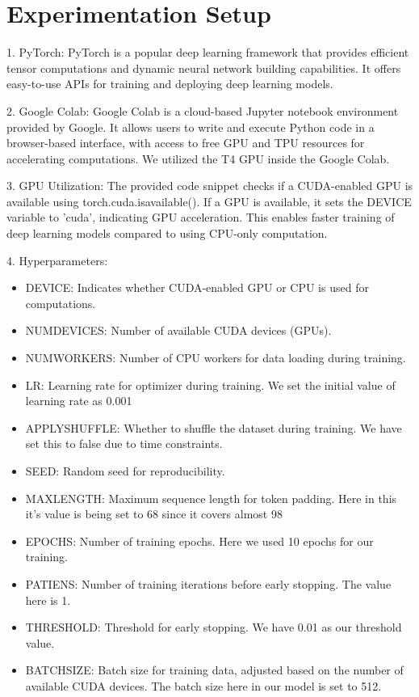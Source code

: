 \documentclass[12pt,a4paper]{report}     %
\begin{document}
\begin{normalsize}
{{\begin{itemize}
\end{itemize}
\section{Experimentation Setup }
1. PyTorch: PyTorch is a popular deep learning framework that provides efficient tensor computations and dynamic neural network building capabilities. It offers easy-to-use APIs for training and deploying deep learning models.

2. Google Colab: Google Colab is a cloud-based Jupyter notebook environment provided by Google. It allows users to write and execute Python code in a browser-based interface, with access to free GPU and TPU resources for accelerating computations. We utilized the T4 GPU inside the Google Colab.

3. GPU Utilization: The provided code snippet checks if a CUDA-enabled GPU is available using torch.cuda.is\textunderscore available(). If a GPU is available, it sets the DEVICE variable to 'cuda', indicating GPU acceleration. This enables faster training of deep learning models compared to using CPU-only computation.

4. Hyperparameters:
\begin{itemize}
\item DEVICE: Indicates whether CUDA-enabled GPU or CPU is used for computations.
\item NUM\textunderscore DEVICES: Number of available CUDA devices (GPUs).
\item  NUM\textunderscore WORKERS: Number of CPU workers for data loading during training.
\item  LR: Learning rate for optimizer during training. We set the initial value of learning rate as 0.001
\item APPLY\textunderscore SHUFFLE: Whether to shuffle the dataset during training. We have set this to false due to time constraints.
\item SEED: Random seed for reproducibility.
\item  MAX\textunderscore LENGTH: Maximum sequence length for token padding. Here in this it's value is being set to 68 since it covers almost 98%
\item  EPOCHS: Number of training epochs. Here we used 10 epochs for our training.
\item  PATIENS: Number of training iterations before early stopping. The value here is 1.
\item  THRESHOLD: Threshold for early stopping. We have 0.01 as our threshold value.
\item  BATCH\textunderscore SIZE: Batch size for training data, adjusted based on the number of available CUDA devices. The batch size here in our model is set to 512.
\end{itemize}

}}
\end{normalsize}
\end{document}
